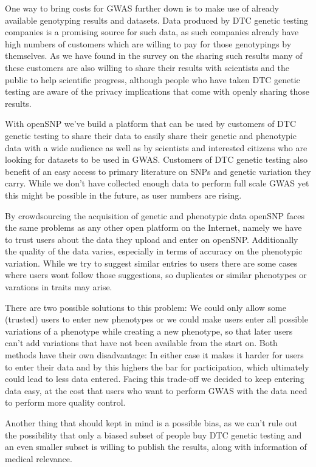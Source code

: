 \documentclass[10pt]{article}
\begin{document}
One way to bring costs for GWAS further down is to make use of already available genotyping results and datasets. Data produced by DTC genetic testing companies is a promising source for such data, as such companies already have high numbers of customers which are willing to pay for those genotypings by themselves. As we have found in the survey on the sharing such results many of these customers are also willing to share their results with scientists and the public to help scientific progress, although people who have taken DTC genetic testing are aware of the privacy implications that come with openly sharing those results.      

With openSNP we've build a platform that can be used by customers of DTC genetic testing to share their data to easily share their genetic and phenotypic data with a wide audience as well as by scientists and interested citizens who are looking for datasets to be used in GWAS. Customers of DTC genetic testing also benefit of an easy access to primary literature on SNPs and genetic variation they carry. While we don't have collected enough data to perform full scale GWAS yet this might be possible in the future, as user numbers are rising. 

By crowdsourcing the acquisition of genetic and phenotypic data openSNP faces the same problems as any other open platform on the Internet, namely we have to trust users about the data they upload and enter on openSNP. Additionally the quality of the data varies, especially in terms of accuracy on the phenotypic variation. While we try to suggest similar entries to users there are some cases where users wont follow those suggestions, so duplicates or similar phenotypes or varations in traits may arise. 

There are two possible solutions to this problem: We could only allow some (trusted) users to enter new phenotypes or we could make users enter all possible variations of a phenotype while creating a new phenotype, so that later users can't add variations that have not been available from the start on. Both methods have their own disadvantage: In either case it makes it harder for users to enter their data and by this highers the bar for participation, which ultimately could lead to less data entered. Facing this trade-off we decided to keep entering data easy, at the cost that users who want to perform GWAS with the data need to perform more quality control.

Another thing that should kept in mind is a possible bias, as we can't rule out the possibility that only a biased subset of people buy DTC genetic testing and an even smaller subset is willing to publish the results, along with information of medical relevance.
\end{document}
